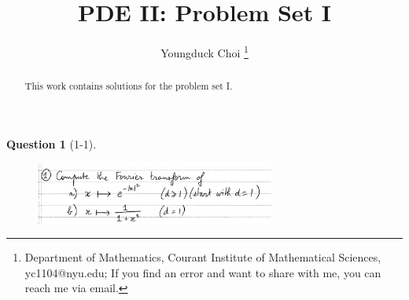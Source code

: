 \documentclass[11pt]{article}
\date{}
\title{\vspace{-0.7cm}
PDE II: Problem Set I}
\author{
Youngduck Choi 
\thanks{Department of Mathematics, Courant Institute of Mathematical Sciences, 
yc1104@nyu.edu; If you find an error and want to share with me, 
you can reach me via email.
}}
\theoremstyle{plain}
\theoremstyle{quest}
\newtheorem*{question}{Question}
\begin{document}
\maketitle

\begin{abstract}
This work contains solutions for the problem set I.
\end{abstract}


\begin{question}[1-1]
\hfill
\begin{figure}[h!]
  \centering
    \includegraphics[width=0.7\textwidth]{pde2-1-1.png}
\end{figure}
\end{question}
\end{document}
